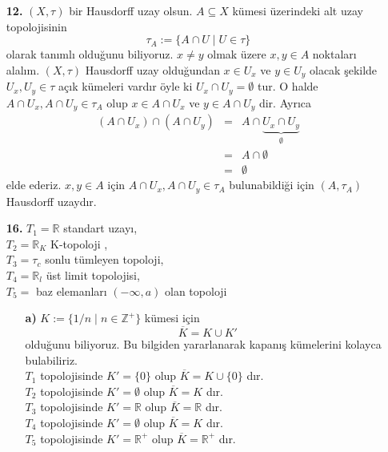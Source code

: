 \documentclass[10pt,a4paper]{article}
\theoremstyle{definition} \newtheorem{teo}{Teorem}
\begin{document}
\begin{enumerate}
\item[\textbf{12.}]
$ (X, \tau) $ bir Hausdorff uzay olsun. $ A\subseteq X $ kümesi üzerindeki alt uzay topolojisinin
\begin{displaymath}
\tau_{A}:= \{A\cap U \mid U \in \tau\}
\end{displaymath}
olarak tanımlı olduğunu biliyoruz. $ x\neq y $ olmak üzere $ x, y \in A $ noktaları alalım. $ (X, \tau) $ Hausdorff uzay olduğundan $ x\in U_{x} $ ve $ y\in U_{y} $ olacak şekilde $ U_{x}, U_{y}\in \tau $ açık kümeleri vardır öyle  ki $ U_{x}\cap U_{y}=\emptyset $ tur. O halde $ A\cap U_{x}, A\cap U_{y} \in \tau_{A} $ olup $ x \in A\cap U_{x} $ ve $ y \in A\cap U_{y} $ dir. Ayrıca
\begin{eqnarray}
(A\cap U_{x})\cap(A\cap U_{y}) &=& A\cap \underbrace{U_{x}\cap U_{y}}_{\emptyset}\nonumber\\
&=&A\cap \emptyset \nonumber\\
&=&\emptyset \nonumber
\end{eqnarray}
elde ederiz. $ x, y \in A $ için $ A\cap U_{x}, A\cap U_{y} \in \tau_{A} $ bulunabildiği için $ (A, \tau_{A}) $ Hausdorff uzaydır.

\item[\textbf{16.}]
$ T_{1}=\mathbb{R} $ standart uzayı, \\$ T_{2}=\mathbb{R}_{K}$ K-topoloji , \\$ T_{3}=\tau_{c} $ sonlu tümleyen topoloji, \\$ T_{4}=\mathbb{R}_{\textit{l}} $ üst limit topolojisi, \\$ T_{5}= $ baz elemanları $(-\infty, a)  $ olan topoloji
\begin{enumerate}
\item[\textbf{a)}]
$K:=\{ 1/n\; |\; n\in \mathbb{Z}^{+}\}$ kümesi için
\begin{displaymath}
\overline{K}=K\cup K'
\end{displaymath}
olduğunu biliyoruz. Bu bilgiden yararlanarak kapanış kümelerini kolayca bulabiliriz.\\
$T_{1}$ topolojisinde $K'=\{0\}$ olup $\overline{K}=K\cup \{0\}$ dır.\\
$T_{2}$ topolojisinde $K'=\emptyset$ olup $\overline{K}=K$ dır.\\
$T_{3}$ topolojisinde $K'=\mathbb{R}$ olup $\overline{K}=\mathbb{R}$ dır.\\
$T_{4}$ topolojisinde $K'=\emptyset$ olup $\overline{K}=K$ dır.\\
$T_{5}$ topolojisinde $K'=\mathbb{R^{+}}$ olup $\overline{K}=\mathbb{R^{+}}$ dır.\\



\end{enumerate}
\end{enumerate}
\end{document}
